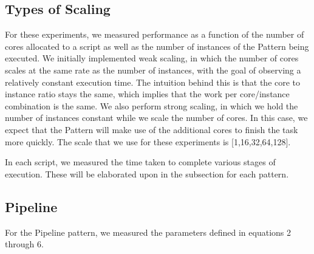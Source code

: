 \documentclass[]{article}
\begin{document}
	\subsection{Types of Scaling}
		For these experiments, we measured performance as a function of the number of cores allocated to a script as well as the number of instances of the Pattern being executed. We initially implemented weak scaling, in which the number of cores scales at the same rate as the number of instances, with the goal of observing a relatively constant execution time. The intuition behind this is that the core to instance ratio stays the same, which implies that the work per core/instance combination is the same. We also perform strong scaling, in which we hold the number of instances constant while we scale the number of cores. In this case, we expect that the Pattern will make use of the additional cores to finish the task more quickly. The scale that we use for these experiments is [1,16,32,64,128].

		In each script, we measured the time taken to complete various stages of execution. These will be elaborated upon in the subsection for each pattern.

	\subsection{Pipeline}
		For the Pipeline pattern, we measured the parameters defined in equations 2 through 6. 
\end{document}
